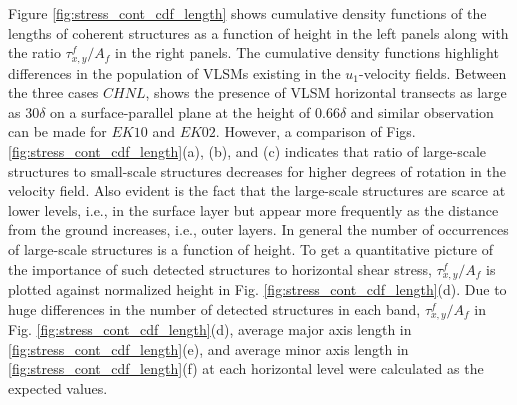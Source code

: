 Figure \ref{fig:stress_cont_cdf_length}  shows cumulative density functions of the lengths of coherent structures as a function of height in the left panels along with the ratio  $\tau_{x,y}^f/A_f$ in the right  panels. The cumulative density functions highlight differences in the population of VLSMs existing  in the $u_1$-velocity fields. Between the three cases $CHNL$, shows the presence of VLSM horizontal transects  as large as $30\delta$ on a surface-parallel plane at the height of  $0.66\delta$ and similar observation can be made for $EK10$ and $EK02$. However,  a comparison of Figs. \ref{fig:stress_cont_cdf_length}(a), (b), and (c) indicates that ratio of large-scale structures to small-scale structures decreases for higher degrees of rotation  in the velocity field. Also evident is the fact that the large-scale structures are scarce at lower levels, i.e., in the surface layer but appear more frequently as the distance from the ground increases, i.e., outer layers. In general the number of occurrences of large-scale structures is a function of height.  To get a quantitative picture of the importance of such detected structures to horizontal shear stress, $\tau_{x,y}^f/A_f$ is plotted against normalized height in Fig. \ref{fig:stress_cont_cdf_length}(d).  Due to huge differences in the number of detected structures in each band, $\tau_{x,y}^f/A_f$ in Fig. \ref{fig:stress_cont_cdf_length}(d), average major axis length in \ref{fig:stress_cont_cdf_length}(e), and average minor axis length in \ref{fig:stress_cont_cdf_length}(f) at each horizontal level were calculated as the expected values. 
